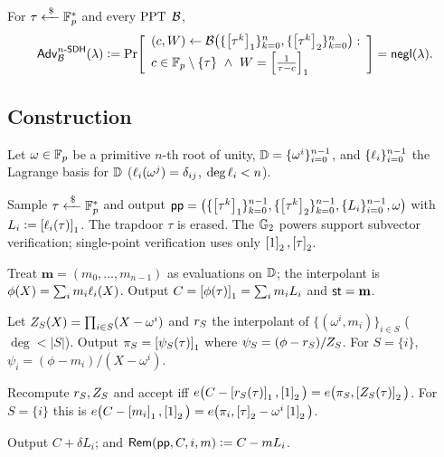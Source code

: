 \begin{assumption}\label{ass:nsdh}
For $\tau\xleftarrow{\;\$\;}\mathbb{F}_p^{*}$ and every $\mathrm{PPT}$ $\mathcal{B}$,
\[
  \mathsf{Adv}^{n\text{-}\mathsf{SDH}}_{\mathcal{B}}(\lambda)\vcentcolon=
  \Pr\!\left[
  \begin{array}{l}
    (c,W)\leftarrow\mathcal{B}\big(\{\left[\tau^{k}\right]_{1}\}_{k=0}^{n},
                          \{\left[\tau^{k}\right]_{2}\}_{k=0}^{n}\big):\\[2pt]
    c\in\mathbb{F}_p\setminus\{\tau\}\ \wedge\ W=\left[\tfrac{1}{\tau-c}\right]_{1}
  \end{array}
  \right]=\mathsf{negl}(\lambda).
\]
\end{assumption}

\subsection{Construction}

Let $\omega\in\mathbb{F}_p$ be a primitive $n$-th root of unity,
$\mathbb{D}=\{\omega^{i}\}_{i=0}^{n-1}$, and $\{\ell_i\}_{i=0}^{n-1}$ the Lagrange basis
for $\mathbb{D}$ ($\ell_i(\omega^{j})=\delta_{ij}$, $\deg\ell_i<n$).

\begin{construction}\label{con:vc}
\leavevmode
\begin{description}[leftmargin=0em,itemsep=4pt]
\item[$\VC.\Setup(1^\secpar,1^{n})$.] Sample $\tau\xleftarrow{\;\$\;}\mathbb{F}_p^{*}$ and output
      $\mathsf{pp}=\big(\{\left[\tau^{k}\right]_{1}\}_{k=0}^{n-1},\{\left[\tau^{k}\right]_{2}\}_{k=0}^{n-1},
      \{L_i\}_{i=0}^{n-1},\omega\big)$ with $L_i\vcentcolon=\left[\ell_i(\tau)\right]_{1}$. The
      trapdoor $\tau$ is erased. The $\mathbb{G}_2$ powers support subvector
      verification; single-point verification uses only $\left[1\right]_{2},\left[\tau\right]_{2}$.
\item[$\VC.\Commit(\pp,\mathbf{m})$.] Treat $\mathbf{m}=(m_0,\dots,m_{n-1})$ as
      evaluations on $\mathbb{D}$; the interpolant is $\phi(X)=\sum_i m_i\ell_i(X)$.
      Output $C=\left[\phi(\tau)\right]_{1}=\sum_{i}m_i L_i$ and $\mathsf{st}=\mathbf{m}$.
\item[$\VC.\Open(\pp,\aux,S)$.] Let $Z_S(X)=\prod_{i\in S}(X-\omega^{i})$ and
      $r_S$ the interpolant of $\{(\omega^{i},m_i)\}_{i\in S}$ ($\deg<|S|$).
      Output $\pi_S=\left[\psi_S(\tau)\right]_{1}$ where
      $\psi_S=(\phi-r_S)/Z_S$. For $S=\{i\}$,
      $\psi_i=(\phi-m_i)/(X-\omega^{i})$.
\item[$\VC.\Vfy(\pp,C,S,\{m_i\}_{i\in S},\pi_S)$.] Recompute $r_S,Z_S$ and
      accept iff
      $e\big(C-\left[r_S(\tau)\right]_{1},\left[1\right]_{2}\big)=e\big(\pi_S,\left[Z_S(\tau)\right]_{2}\big)$.
      For $S=\{i\}$ this is
      $e\big(C-\left[m_i\right]_{1},\left[1\right]_{2}\big)=e\big(\pi_i,\left[\tau\right]_{2}-\omega^{i}\left[1\right]_{2}\big)$.
\item[$\VC.\Update(\pp,C,i,\delta)$.] Output $C+\delta L_i$; and
      $\mathsf{Rem}(\mathsf{pp},C,i,m)\vcentcolon= C-m L_i$.
\end{description}
\end{construction}

